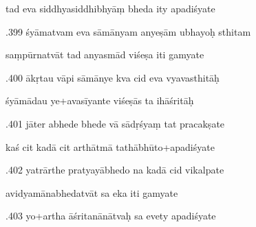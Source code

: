 \documentclass[article,12pt,a4paper]{memoir}%
\newcounter{parCount}
\begin{document}
	  
	  \pstart \leavevmode%
	tad eva siddhyasiddhibhyāṃ bheda ity apadiśyate 
	{}
	\pend%
      

	  
	  \pstart {}.399 śyāmatvam eva sāmānyam anyeṣām ubhayoḥ sthitam 
	{}
	\pend%
      

	  
	  \pstart \leavevmode%
	saṃpūrnatvāt tad anyasmād viśeṣa iti gamyate 
	{}
	\pend%
      

	  
	  \pstart {}.400 ākṛtau vāpi sāmānye kva cid eva vyavasthitāḥ 
	{}
	\pend%
      

	  
	  \pstart \leavevmode%
	śyāmādau ye+avasīyante viśeṣās ta ihāśritāḥ 
	{}
	\pend%
      

	  
	  \pstart {}.401 jāter abhede bhede vā sādṛśyaṃ tat pracakṣate 
	{}
	\pend%
      

	  
	  \pstart \leavevmode%
	kaś cit kadā cit arthātmā tathābhūto+apadiśyate 
	{}
	\pend%
      

	  
	  \pstart {}.402 yatrārthe pratyayābhedo na kadā cid vikalpate 
	{}
	\pend%
      

	  
	  \pstart \leavevmode%
	avidyamānabhedatvāt sa eka iti gamyate 
	{}
	\pend%
      

	  
	  \pstart {}.403 yo+artha āśritanānātvaḥ sa evety apadiśyate 
	{}
	\pend%
      
\end{document}
